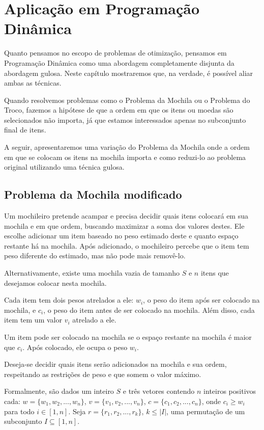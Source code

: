 \chapter{Aplicação em Programação Dinâmica}
\label{pd}

Quanto pensamos no escopo de problemas de otimização, pensamos em Programação Dinâmica como uma abordagem completamente disjunta da abordagem gulosa. Neste capítulo mostraremos que, na verdade, é possível aliar ambas as técnicas.

Quando resolvemos problemas como o Problema da Mochila ou o Problema do Troco, fazemos a hipótese de que a ordem em que os itens ou moedas são selecionados não importa, já que estamos interessados apenas no subconjunto final de itens.

A seguir, apresentaremos uma variação do Problema da Mochila onde a ordem em que se colocam os itens na mochila importa e como reduzi-lo ao problema original utilizando uma técnica gulosa.

\section{Problema da Mochila modificado}

Um mochileiro pretende acampar e precisa decidir quais itens colocará em sua mochila e em que ordem, buscando maximizar a soma dos valores destes. Ele escolhe adicionar um item baseado no peso estimado deste e quanto espaço restante há na mochila. Após adicionado, o mochileiro percebe que o item tem peso diferente do estimado, mas não pode mais removê-lo.

Alternativamente, existe uma mochila vazia de tamanho $S$ e $n$ itens que desejamos colocar nesta mochila.

Cada item tem dois pesos atrelados a ele: $w_i$, o peso do item após ser colocado na mochila, e $c_i$, o peso do item antes de ser colocado na mochila. Além disso, cada item tem um valor $v_i$ atrelado a ele.

Um item pode ser colocado na mochila se o espaço restante na mochila é maior que $c_i$. Após colocado, ele ocupa o peso $w_i$.

Deseja-se decidir quais itens serão adicionados na mochila e sua ordem, respeitando as restrições de peso e que somem o valor máximo.

Formalmente, são dados um inteiro $S$ e três vetores contendo $n$ inteiros positivos cada: $w = \{w_1, w_2, ..., w_n\}$, $v = \{v_1, v_2, ..., v_n\}$, $c = \{c_1, c_2, ..., c_n\}$, onde $c_i \geq w_i$ para todo $i \in [1, n]$. Seja $r = \{r_1, r_2, ..., r_k\}$, $k \leq |I|$, uma permutação de um subconjunto $I \subseteq [1, n]$. 

